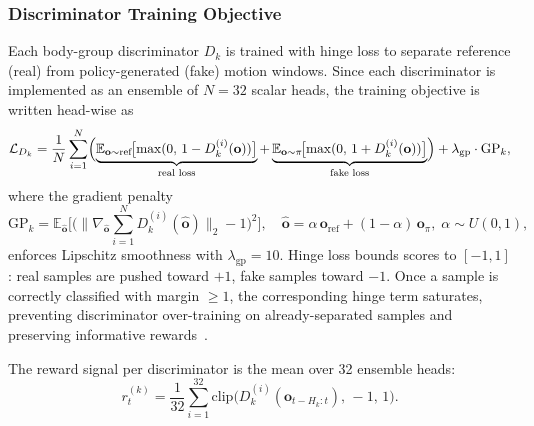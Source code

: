 \subsubsection{Discriminator Training Objective}
Each body-group discriminator $D_k$ is trained with hinge loss to separate reference (real) from policy-generated (fake) motion windows. Since each discriminator is implemented as an ensemble of $N=32$ scalar heads, the training objective is written head-wise as
\begin{equation}
    \mathcal{L}_{D_k}
    =
    \frac{1}{N}\sum_{i=1}^{N}
    \Bigl(
        \underbrace{\mathbb{E}_{\mathbf{o} \sim \mathrm{ref}}\!\bigl[\max(0,\, 1 - D_k^{(i)}(\mathbf{o}))\bigr]}_{\text{real loss}}
        +
        \underbrace{\mathbb{E}_{\mathbf{o} \sim \pi}\!\bigl[\max(0,\, 1 + D_k^{(i)}(\mathbf{o}))\bigr]}_{\text{fake loss}}
    \Bigr)
    +
    \lambda_{\text{gp}} \cdot \mathrm{GP}_k,
    \label{eq:disc_loss}
\end{equation}
where the gradient penalty~\cite{wgangp2017}
\[
    \mathrm{GP}_k = \mathbb{E}_{\hat{\mathbf{o}}}\!\bigl[\bigl(\|\nabla_{\hat{\mathbf{o}}} \sum_{i=1}^{N} D_k^{(i)}(\hat{\mathbf{o}})\|_2 - 1\bigr)^2\bigr],
    \quad \hat{\mathbf{o}} = \alpha\,\mathbf{o}_{\text{ref}} + (1{-}\alpha)\,\mathbf{o}_\pi,\; \alpha \sim U(0,1),
\]
enforces Lipschitz smoothness with $\lambda_{\text{gp}} = 10$. Hinge loss bounds scores to $[-1,1]$: real samples are pushed toward $+1$, fake samples toward $-1$. Once a sample is correctly classified with margin $\geq 1$, the corresponding hinge term saturates, preventing discriminator over-training on already-separated samples and preserving informative rewards~\cite{iccgan2021}.

The reward signal per discriminator is the mean over 32 ensemble heads:
\[
    r_t^{(k)} = \frac{1}{32}\sum_{i=1}^{32} \mathrm{clip}\!\bigl(D_k^{(i)}(\mathbf{o}_{t-H_k:t}),\, -1,\, 1\bigr).
\]

